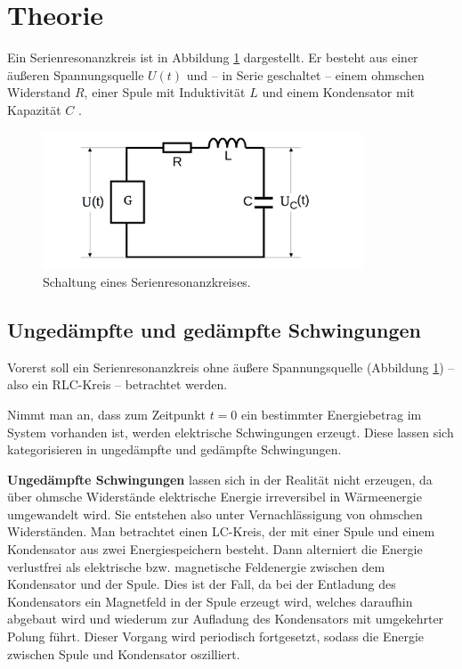 \section{Theorie}
\label{sec:Theorie}


Ein Serienresonanzkreis ist in Abbildung \ref{fig:serienreson} dargestellt.
Er besteht aus einer äußeren Spannungsquelle $U(t)$ und -- in Serie
geschaltet -- einem ohmschen Widerstand $R$, einer Spule mit Induktivität $L$ und einem Kondensator
mit Kapazität $C$ \cite{noltingbro}.

\begin{figure}
	\centering
	\includegraphics[width=0.85\textwidth]{Bilder/Aufbau.png}
	\caption{Schaltung eines Serienresonanzkreises. \cite{Anleitung}}
	\label{fig:serienreson}
\end{figure}


\subsection{Ungedämpfte und gedämpfte Schwingungen}

Vorerst soll ein Serienresonanzkreis ohne äußere Spannungsquelle (Abbildung \ref{fig:serienreson}) -- also ein RLC-Kreis -- betrachtet werden.

Nimmt man an, dass zum Zeitpunkt $t=0$ ein bestimmter Energiebetrag im System vorhanden ist,
werden elektrische Schwingungen erzeugt.
Diese lassen sich kategorisieren in ungedämpfte und gedämpfte Schwingungen.

\textbf{Ungedämpfte Schwingungen} lassen sich in der Realität nicht erzeugen, da über ohmsche
Widerstände elektrische Energie irreversibel in Wärmeenergie umgewandelt wird.
Sie entstehen also unter Vernachlässigung von ohmschen Widerständen.
Man betrachtet einen LC-Kreis, der mit einer Spule und einem Kondensator aus zwei
Energiespeichern besteht.
Dann alterniert die Energie verlustfrei als elektrische bzw. magnetische Feldenergie zwischen dem Kondensator und der Spule.
Dies ist der Fall, da bei der Entladung des Kondensators ein Magnetfeld in der Spule erzeugt
wird, welches daraufhin abgebaut wird und wiederum zur Aufladung des Kondensators mit
umgekehrter Polung führt. Dieser Vorgang wird periodisch fortgesetzt, sodass die Energie zwischen Spule und Kondensator oszilliert.

